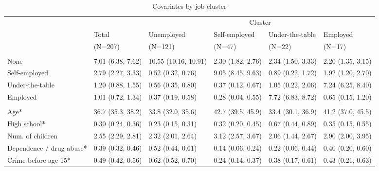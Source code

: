 
\begin{table}[htp]
\scriptsize
\caption{Covariates by job cluster}
\label{tab:desc_job_clusters}
\setlength{\tabcolsep}{5pt}
\renewcommand{\arraystretch}{1.3}
\begin{threeparttable}
\begin{tabular}{llllll}
\hline
\addlinespace[8pt]
& & \multicolumn{4}{c}{Cluster} \\
\addlinespace
\cmidrule(lr){3-6} 
\addlinespace
& \multicolumn{1}{l}{Total} & \multicolumn{1}{l}{Unemployed} & \multicolumn{1}{l}{Self-employed} & \multicolumn{1}{l}{Under-the-table} & \multicolumn{1}{l}{Employed} \\
& \multicolumn{1}{l}{(N=207)} & \multicolumn{1}{l}{(N=121)} & \multicolumn{1}{l}{(N=47)} & \multicolumn{1}{l}{(N=22)} & \multicolumn{1}{l}{(N=17)} \\
\addlinespace[8pt]
\hline
\addlinespace[12pt]
\multicolumn{6}{l}{\textbf{Time spent on job (months)}} \\
\addlinespace
\quad None & 7.01 (6.38, 7.62) & 10.55 (10.16, 10.91) & 2.30 (1.82, 2.76) & 2.34 (1.50, 3.33) & 2.20 (1.35, 3.15) \\ 
  \quad Self-employed & 2.79 (2.27, 3.33) & 0.52 (0.32, 0.76) & 9.05 (8.45, 9.63) & 0.89 (0.22, 1.72) & 1.92 (1.20, 2.70) \\ 
  \quad Under-the-table & 1.20 (0.88, 1.55) & 0.56 (0.35, 0.80) & 0.37 (0.12, 0.67) & 1.05 (0.22, 2.06) & 7.24 (6.25, 8.40) \\ 
  \quad Employed & 1.01 (0.72, 1.34) & 0.37 (0.19, 0.58) & 0.28 (0.04, 0.55) & 7.72 (6.83, 8.72) & 0.65 (0.15, 1.20) \\ 
  \addlinespace[12pt]
\multicolumn{6}{l}{\textbf{Covariates (average)*}} \\
\addlinespace
\quad Age* & 36.7 (35.3, 38.2) & 33.8 (32.0, 35.6) & 42.7 (39.5, 45.9) & 33.4 (30.1, 36.9) & 41.2 (37.0, 45.5) \\ 
  \quad High school* & 0.30 (0.24, 0.36) & 0.23 (0.15, 0.31) & 0.32 (0.20, 0.45) & 0.67 (0.44, 0.89) & 0.35 (0.15, 0.55) \\ 
  \quad Num. of children & 2.55 (2.29, 2.81) & 2.32 (2.01, 2.64) & 3.12 (2.57, 3.67) & 2.06 (1.44, 2.67) & 2.90 (2.00, 3.95) \\ 
  \quad Dependence / drug abuse* & 0.39 (0.32, 0.46) & 0.52 (0.44, 0.61) & 0.14 (0.06, 0.24) & 0.22 (0.06, 0.44) & 0.40 (0.20, 0.60) \\ 
  \quad Crime before age 15* & 0.49 (0.42, 0.56) & 0.62 (0.52, 0.70) & 0.24 (0.14, 0.37) & 0.38 (0.17, 0.61) & 0.43 (0.21, 0.63) \\ 

\end{tabular}
\end{threeparttable}
\end{table}
